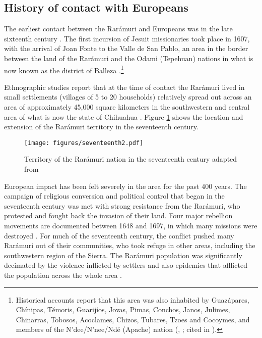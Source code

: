 \subsection{History of contact with Europeans}
\label{subsec: history of contact with Europeans}

The earliest contact between the Rarámuri and Europeans was in the late sixteenth century \citep{merrill2014ralamuli}. The first incursion of Jesuit missionaries took place in 1607, with the arrival of Joan Fonte to the Valle de San Pablo, an area in the border between the land of the Rarámuri and the Odami ({Tepehuan}) nations in what is now known as the district of Balleza \citep{alegre1842historia,pintado2012hijos}.\footnote{Historical accounts report that this area was also inhabited by Guazápares, Chínipas, Témoris, Guarijíos, Jovas, Pimas, Conchos, Janos, Julimes, Chinarras, Tobosos, Acoclames, Chizos, Tubares, Tzoes and Cocoymes, and members of the N’dee/N’nee/Ndé (Apache) nation (\citealt[][53]{neumann1991historia}, \citealt[368]{gonzalez1987cronicas}; cited in \citealt{pintado2012hijos}).}

Ethnographic studies report that at the time of contact the Rarámuri lived in small settlements (villages of 5 to 20 households) relatively spread out across an area of approximately 45,000 square kilometers in the southwestern and central area of what is now the state of Chihuahua \citep{pennington1963tarahumar,merrill2014ralamuli}. Figure \ref{fig: Raramuri land 17th century} shows the location and extension of the Rarámuri territory in the seventeenth century.

\begin{figure}
\texttt{[image: figures/seventeenth2.pdf]}
\caption{
\label{fig: Raramuri land 17th century}
Territory of the Rarámuri nation in the seventeenth century adapted from \citet[230]{merrill2014ralamuli}
}
\end{figure}

European impact has been felt severely in the area for the past 400 years. The campaign of religious conversion and political control that began in the seventeenth century was met with strong resistance from the Rarámuri, who protested and fought back the invasion of their land. Four major rebellion movements are documented between 1648 and 1697, in which many missions were destroyed \citep{neumann1991historia,gonzalez1982tarahumara,levi1999hidden,rodriguez1991testimonios}. For much of the seventeenth century, the conflict pushed many Rarámuri out of their communities, who took refuge in other areas, including the southwestern region of the Sierra. The Rarámuri population was significantly decimated by the violence inflicted by settlers and also epidemics that afflicted the population across the whole area \citep{pintado2012hijos}.

